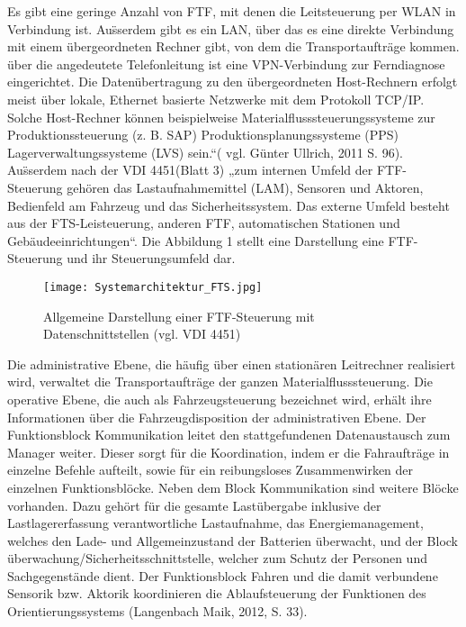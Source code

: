 Es gibt eine geringe Anzahl von FTF, mit denen die Leitsteuerung per WLAN in Verbindung ist. Au\"sserdem gibt es ein LAN, \"uber das es eine direkte Verbindung mit einem \"ubergeordneten Rechner gibt, von dem die Transportauftr\"age kommen. \"uber die angedeutete Telefonleitung ist eine VPN-Verbindung zur Ferndiagnose eingerichtet. Die Daten\"ubertragung zu den \"ubergeordneten Host-Rechnern erfolgt meist \"uber lokale, Ethernet basierte Netzwerke mit dem Protokoll TCP/IP. Solche Host-Rechner k\"onnen beispielweise Materialflusssteuerungssysteme zur Produktionssteuerung (z. B. SAP) Produktionsplanungssysteme (PPS) Lagerverwaltungssysteme (LVS) sein.“( vgl. G\"unter Ullrich, 2011 S. 96). 
Au\"sserdem nach der VDI 4451(Blatt 3) „zum internen Umfeld der FTF-Steuerung geh\"oren das Lastaufnahmemittel (LAM), Sensoren und Aktoren, Bedienfeld am Fahrzeug und das Sicherheitssystem. Das externe Umfeld besteht aus der FTS-Leisteuerung, anderen FTF, automatischen Stationen und Geb\"audeeinrichtungen“. Die Abbildung 1 stellt eine Darstellung eine FTF-Steuerung und ihr Steuerungsumfeld dar.
	\begin{figure}[h!]
		\centering
		\texttt{[image: Systemarchitektur\_FTS.jpg]}
		\caption{Allgemeine Darstellung einer FTF-Steuerung mit Datenschnittstellen (vgl. VDI 4451)}
		\label{Wertschoepfungskette}
	\end{figure}
Die administrative Ebene, die h\"aufig \"uber einen station\"aren Leitrechner realisiert wird, verwaltet die Transportauftr\"age der ganzen Materialflusssteuerung. Die operative Ebene, die auch als Fahrzeugsteuerung bezeichnet wird, erh\"alt ihre Informationen \"uber die Fahrzeugdisposition der administrativen Ebene. Der Funktionsblock Kommunikation leitet den stattgefundenen Datenaustausch zum Manager weiter. Dieser sorgt f\"ur die Koordination, indem er die Fahrauftr\"age in einzelne Befehle aufteilt, sowie f\"ur ein reibungsloses Zusammenwirken der einzelnen Funktionsbl\"ocke. Neben dem Block Kommunikation sind weitere Bl\"ocke vorhanden. Dazu geh\"ort f\"ur die gesamte Last\"ubergabe inklusive der Lastlagererfassung verantwortliche Lastaufnahme, das Energiemanagement, welches den Lade- und Allgemeinzustand der Batterien \"uberwacht, und der Block \"uberwachung/Sicherheitsschnittstelle, welcher zum Schutz der Personen und Sachgegenst\"ande dient. Der Funktionsblock Fahren und die damit verbundene Sensorik bzw. Aktorik koordinieren die Ablaufsteuerung der Funktionen des Orientierungssystems (Langenbach Maik, 2012, S. 33).

